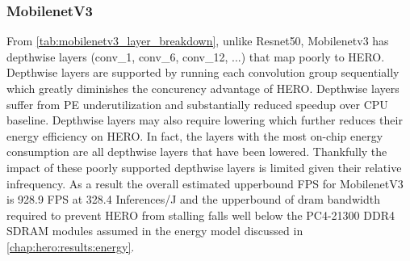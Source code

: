 \subsubsection{MobilenetV3}

From \autoref{tab:mobilenetv3_layer_breakdown}, unlike Resnet50, Mobilenetv3 has
depthwise layers (conv\_1, conv\_6, conv\_12, ...) that map poorly to HERO.
Depthwise layers are supported by running each convolution group sequentially
which greatly diminishes the concurency advantage of HERO. Depthwise layers
suffer from PE underutilization and substantially reduced speedup over CPU
baseline. Depthwise layers may also require lowering which further reduces their
energy efficiency on HERO. In fact, the layers with the most on-chip energy
consumption are all depthwise layers that have been lowered. Thankfully the
impact of these poorly supported depthwise layers is limited given their
relative infrequency. As a result the overall estimated upperbound FPS for
MobilenetV3 is 928.9 FPS at 328.4 Inferences/J and the upperbound of dram bandwidth
required to prevent HERO from stalling falls well below the PC4-21300 DDR4 SDRAM
modules assumed in the energy model discussed in
\autoref{chap:hero:results:energy}. 


